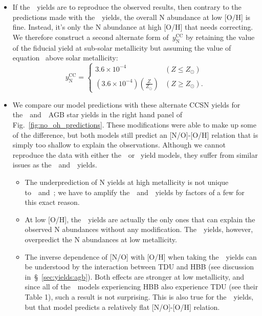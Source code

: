 \documentclass[ms.tex]{subfiles}
\begin{document}
\begin{itemize}
\begin{itemize}
		\item If the~\karakas~yields are to reproduce the observed results, 
		then contrary to the predictions made with the~\karakasten~yields, the 
		overall N abundance at low [O/H] is fine. 
		Instead, it's only the N abundance at high [O/H] that needs 
		correcting. 
		We therefore construct a second alternate form of~$y_\text{N}^\text{CC}$ 
		by retaining the value of the fiducial yield at sub-solar metallicity 
		but assuming the value of equation~ above solar 
		metallicity: 
		\begin{equation} 
		y_\text{N}^\text{CC} = \begin{cases} 
		3.6\times10^{-4} & (Z \leq Z_\odot) 
		\\ 
		(3.6\times10^{-4})\left(\frac{Z}{Z_\odot}\right) & (Z \geq Z_\odot). 
		\end{cases} 
		\label{eq:broken_yncc} 
		\end{equation} 

		\item We compare our model predictions with these alternate CCSN yields 
		for the~\karakasten~and~\karakas~AGB star yields in the right hand 
		panel of Fig.~\ref{fig:no_oh_predictions}. 
		These modifications were able to make up some of the difference, but 
		both models still predict an [N/O]-[O/H] relation that is simply too 
		shallow to explain the observations. 
		Although we cannot reproduce the data with either the~\karakasten~or 
		\karakas~yield models, they suffer from similar issues as 
		the~\cristallo~and~\ventura~yields. 
		\begin{itemize} 
			\item The underprediction of N yields at high metallicity is not 
			unique to~\karakasten~and~\karakas; we have to amplify 
			the~\cristallo~and~\ventura~yields by factors of a few for this 
			exact reason. 

			\item At low [O/H], the~\karakas~yields are actually the only ones 
			that can explain the observed N abundances without any 
			modification. 
			The~\karakasten~yields, however, overpredict the N abundances at 
			low metallicity. 

			\item The inverse dependence of [N/O] with [O/H] when taking 
			the~\karakasten~yields can be understood by the interaction between 
			TDU and HBB (see discussion in~\S~\ref{sec:yields:agb}). 
			Both effects are stronger at low metallicity, and since all of 
			the~\karakasten~models experiencing HBB also experience TDU (see 
			their Table 1), such a result is not surprising. 
			This is also true for the~\karakas~yields, but that model predicts 
			a relatively flat [N/O]-[O/H] relation. 
			

\end{itemize}
\end{itemize}
\end{itemize}
\end{document}
